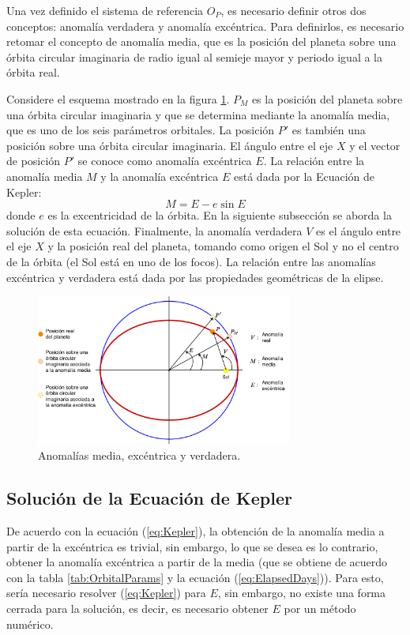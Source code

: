 \documentclass[a4paper,10pt]{article}
\begin{document}
Una vez definido el sistema de referencia $O_P$, es necesario definir otros dos conceptos: anomalía verdadera y anomalía excéntrica. Para definirlos, es necesario retomar el concepto de anomalía media, que es la posición del planeta sobre una órbita circular imaginaria de radio igual al semieje mayor y periodo igual a la órbita real.

Considere el esquema mostrado en la figura \ref{fig:Anomalies}. $P_M$ es la posición del planeta sobre una órbita circular imaginaria y que se determina mediante la anomalía media, que es uno de los seis parámetros orbitales. La posición $P'$ es también una posición sobre una órbita circular imaginaria. El ángulo entre el eje $X$ y el vector de posición $P'$ se conoce como anomalía excéntrica $E$. La relación entre la anomalía media $M$ y la anomalía excéntrica $E$ está dada por la Ecuación de Kepler:
\begin{equation}
  M = E - e\sin E
  \label{eq:Kepler}
\end{equation}
donde $e$ es la excentricidad de la órbita. En la siguiente subsección se aborda la solución de esta ecuación. Finalmente, la anomalía verdadera $V$ es el ángulo entre el eje $X$ y la posición real del planeta, tomando como origen el Sol y no el centro de la órbita (el Sol está en uno de los focos). La relación entre las anomalías excéntrica y verdadera está dada por las propiedades geométricas de la elipse. 
\begin{figure}
  \centering
  \includegraphics[width=0.75\textwidth]{Figures/Anomalies.pdf}
  \caption{Anomalías media, excéntrica y verdadera.}
  \label{fig:Anomalies}
\end{figure}

\subsection{Solución de la Ecuación de Kepler}

De acuerdo con la ecuación (\ref{eq:Kepler}), la obtención de la anomalía media a partir de la excéntrica es trivial, sin embargo, lo que se desea es lo contrario, obtener la anomalía excéntrica a partir de la media (que se obtiene de acuerdo con la tabla \ref{tab:OrbitalParams} y la ecuación (\ref{eq:ElapsedDays})). Para esto, sería necesario resolver (\ref{eq:Kepler}) para $E$, sin embargo, no existe una forma cerrada para la solución, es decir, es necesario obtener $E$ por un método numérico.
\end{document}
